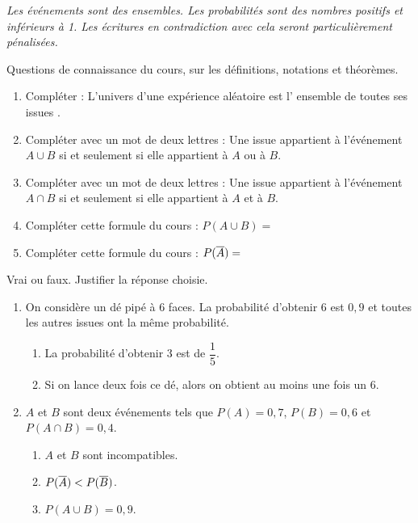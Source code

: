 \documentclass[a4paper,11pt,DIV15,BCOR0mm]{scrartcl}
\begin{document}
{\small
\elevetrue
\emph{
Les événements sont des ensembles. Les probabilités sont des nombres positifs et inférieurs à 1. Les écritures
en contradiction avec cela seront particulièrement pénalisées.
}
\begin{exercice}
 Questions de connaissance du cours, sur les définitions, notations et théorèmes.
\begin{enumerate}
  \item Compléter : \og L'univers d'une expérience aléatoire 
	est l'\ac{ ensemble } de toutes ses \ac{ issues }\fg.
  \item Compléter avec un mot de deux lettres :
	\og Une issue appartient à l'événement $A\cup B$ si et seulement si 
elle appartient à $A$ \ac{ ou } à $B$.\fg
  \item Compléter avec un mot de deux lettres :
	\og Une issue appartient à l'événement $A\cap B$ si et seulement si 
elle appartient à $A$ \ac{ et } à $B$.\fg
  \item Compléter cette formule du cours : $P(A\cup B)=$
  \item Compléter cette formule du cours : $P(\overline{A})=$
\end{enumerate}
\end{exercice}

\begin{exercice}
Vrai  ou faux. Justifier la réponse choisie.
\begin{enumerate}
 \item On considère un dé pipé à 6 faces. La probabilité d'obtenir 6 est $0,9$ et toutes les
autres issues ont la même probabilité.
\begin{enumerate}
  \item La probabilité d'obtenir 3 est de $\dfrac15$.
  \item Si on lance deux fois ce dé, alors on obtient au moins une fois un 6.
\end{enumerate}
  \item $A$ et $B$ sont deux événements tels que $P(A)=0,7$, $P(B)=0,6$ et $P(A\cap B)=0,4$.
\begin{enumerate}
 \item $A$ et $B$ sont incompatibles.
 \item $P(\overline{A})<P(\overline{B})$.
 \item $P(A\cup B)=0,9$.
\end{enumerate}
\end{enumerate}
\end{exercice}

}
\end{document}

